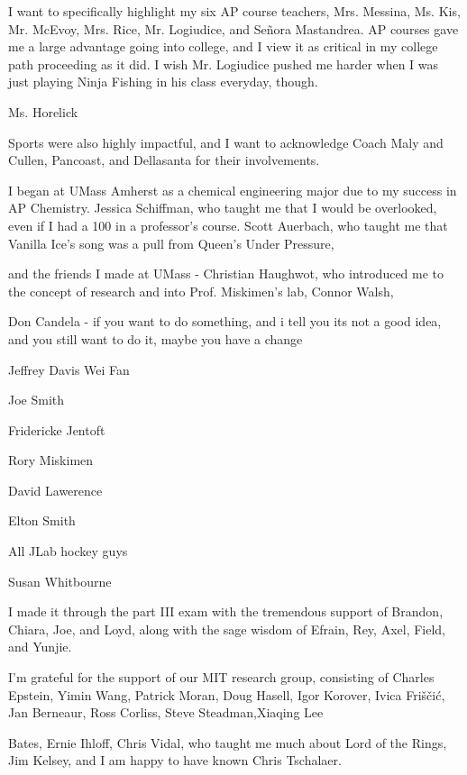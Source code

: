 I want to specifically highlight my six AP course teachers, Mrs. Messina, Ms. Kis, Mr. McEvoy, Mrs. Rice, Mr. Logiudice, and Se\~nora Mastandrea. AP courses gave me a large advantage going into college, and I view it as critical in my college path proceeding as it did. I wish Mr. Logiudice pushed me harder when I was just playing Ninja Fishing in his class everyday, though. 

Ms. Horelick


Sports were also highly impactful, and I want to acknowledge Coach Maly and Cullen, Pancoast, and Dellasanta for their involvements. 


I began at UMass Amherst as a chemical engineering major due to my success in AP Chemistry. Jessica Schiffman, who taught me that I would be overlooked, even if I had a 100 in a professor's course. Scott Auerbach, who taught me that Vanilla Ice's song was a pull from Queen's Under Pressure, 

and the friends I made at UMass - Christian Haughwot, who introduced me to the concept of research and into Prof. Miskimen's lab, Connor Walsh, 

Don Candela - if you want to do something, and i tell you its not a good idea, and you still want to do it, maybe you have a change

Jeffrey Davis
Wei Fan

Joe Smith

Fridericke Jentoft


Rory Miskimen

David Lawerence

Elton Smith

All JLab hockey guys

Susan Whitbourne


I made it through the part III exam with the tremendous support of Brandon, Chiara, Joe, and Loyd, along with the sage wisdom of Efrain, Rey, Axel, Field, and Yunjie. 

I'm grateful for the support of our MIT research group, consisting of Charles Epstein, Yimin Wang, Patrick Moran, Doug Hasell, Igor Korover, Ivica Friščić, Jan Berneaur, Ross Corliss, Steve Steadman,Xiaqing Lee

Bates, Ernie Ihloff, Chris Vidal, who taught me much about Lord of the Rings, Jim Kelsey, and I am happy to have known Chris Tschalaer.




